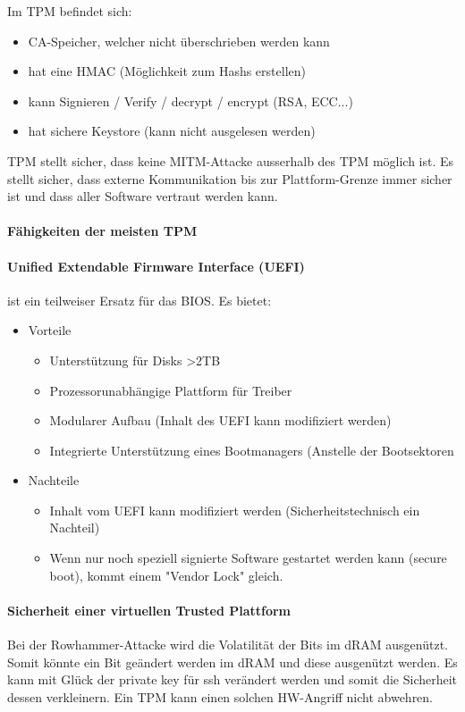 \documentclass[a4paper,12pt]{article}
\begin{document}
Im TPM befindet sich:
\begin{itemize}
\item CA-Speicher, welcher nicht überschrieben werden kann
\item hat eine HMAC (Möglichkeit zum Hashs erstellen)
\item kann Signieren / Verify / decrypt / encrypt (RSA, ECC...)
\item hat sichere Keystore (kann nicht ausgelesen werden)
\end{itemize}

TPM stellt sicher, dass keine MITM-Attacke ausserhalb des TPM möglich ist. Es stellt sicher, dass externe Kommunikation bis zur Plattform-Grenze immer sicher ist und dass aller Software vertraut werden kann.

\paragraph{Fähigkeiten der meisten TPM}

\paragraph{Unified Extendable Firmware Interface (UEFI)} ist ein teilweiser Ersatz für das BIOS.
Es bietet:
\begin{itemize}
\item Vorteile
    \begin{itemize}
    \item Unterstützung für Disks >2TB
    \item Prozessorunabhängige Plattform für Treiber
    \item Modularer Aufbau (Inhalt des UEFI kann modifiziert werden)
    \item Integrierte Unterstützung eines Bootmanagers (Anstelle der Bootsektoren
    \end{itemize}
\item Nachteile
    \begin{itemize}
    \item Inhalt vom UEFI kann modifiziert werden (Sicherheitstechnisch ein Nachteil)
    \item Wenn nur noch speziell signierte Software gestartet werden kann (secure boot), kommt einem "Vendor Lock" gleich.
    \end{itemize}
\end{itemize}

\paragraph{Sicherheit einer virtuellen Trusted Plattform}
Bei der Rowhammer-Attacke wird die Volatilität der Bits im dRAM ausgenützt. Somit könnte ein Bit geändert werden im dRAM und diese ausgenützt werden. Es kann mit Glück der private key für ssh verändert werden und somit die Sicherheit dessen verkleinern. Ein TPM kann einen solchen HW-Angriff nicht abwehren.
\end{document}
